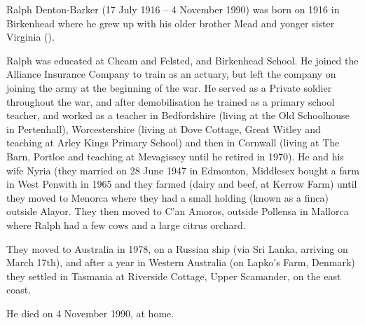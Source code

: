 
Ralph Denton-Barker (17 July 1916 -- 4 November 1990) was born on 1916 in Birkenhead \cite{BMDIndex_RalphMundayDentonBarker_birth} where he grew up with his older brother Mead and yonger sister Virginia ().

Ralph was educated at Cheam and Felsted, and Birkenhead School. He joined the Alliance Insurance Company to train as an actuary, but left the company on joining the army at the beginning of the war. He served as a Private soldier throughout the war, and after demobilisation he trained as a primary school teacher, and worked as a teacher in Bedfordshire (living at the Old Schoolhouse in Pertenhall), Worcestershire (living at Dove Cottage, Great Witley and teaching at Arley Kings Primary School) and then in Cornwall (living at The Barn, Portloe and teaching at Mevagissey until he retired in 1970). He and his wife Nyria (they married on 28 June 1947 in Edmonton, Middlesex \cite{MarriageCertRalphDentonBarkerJoanNyriaPowell} bought a farm in West Penwith in 1965 and they farmed (dairy and beef, at Kerrow Farm) until they moved to Menorca where they had a small holding (known as a finca) outside Alayor. They then moved to C'an Amoros, outside Pollensa in Mallorca where Ralph had a few cows and a large citrus orchard.

They moved to Australia in 1978, on a Russian ship (via Sri Lanka, arriving on March 17th), and after a year in Western Australia (on Lapko's Farm, Denmark) they settled in Tasmania at Riverside Cottage, Upper Scamander, on the east coast.

He died on 4 November 1990, at home.

